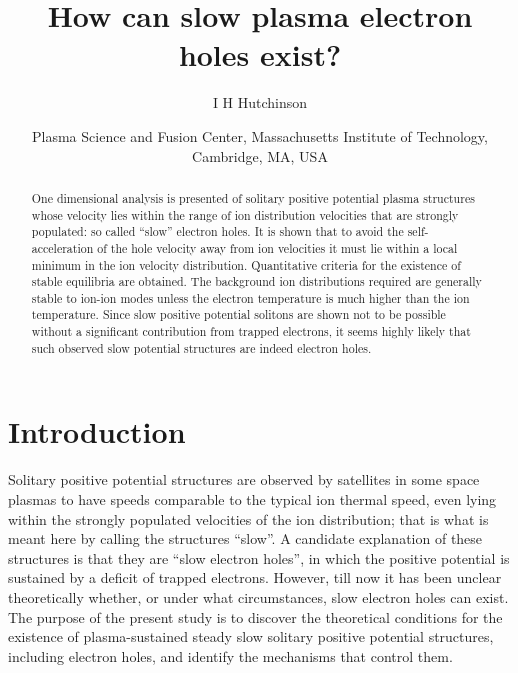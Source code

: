 \documentclass[pre]{revtex4-2}
\def\affiliation#1{\date{\normalsize #1}}
\begin{document}
\title{How can slow plasma electron holes exist?}
\author{I H Hutchinson}
\affiliation{Plasma Science and Fusion Center, Massachusetts
  Institute of Technology, Cambridge, MA, USA} 

\ifx\altaffiliation\undefined\maketitle\fi %
\begin{abstract}
  One dimensional analysis is presented of solitary positive
  potential plasma structures whose velocity lies within the range of ion
  distribution velocities that are strongly populated: so called
  ``slow'' electron holes. It is shown that to avoid the
  self-acceleration of the hole velocity away from ion velocities it
  must lie within a local minimum in the ion velocity distribution.
  Quantitative criteria for the existence of stable equilibria are
  obtained. The background ion distributions required are generally
  stable to ion-ion modes unless the electron temperature is much
  higher than the ion temperature. Since slow positive potential
  solitons are shown not to be possible without a significant
  contribution from trapped electrons, it seems highly likely that
  such observed slow potential structures are indeed electron holes.
\end{abstract}
\ifx\altaffiliation\undefined\else\maketitle\fi  %

\section{Introduction}

Solitary positive potential structures are observed by satellites in
some space plasmas to have speeds comparable to the typical ion
thermal speed, even lying within the strongly populated velocities of
the ion distribution\cite{Graham2016,Steinvall2019,Lotekar2020}; that
is what is meant here by calling the structures ``slow''. A candidate
explanation of these structures is that they are ``slow electron
holes'', in which the positive potential is sustained by a deficit of
trapped electrons. However, till now it has been unclear theoretically
whether, or under what circumstances, slow electron holes can
exist. The purpose of the present study is to discover the theoretical
conditions for the existence of plasma-sustained steady slow solitary
positive potential structures, including electron holes, and identify
the mechanisms that control them.
\end{document}
